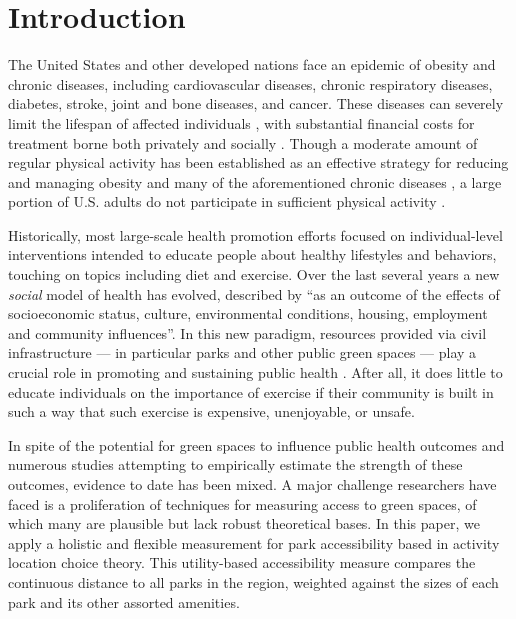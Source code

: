 \documentclass[Afour,sageh.bst]{sagej}
\begin{document}
\clearpage
\newpage
\hypertarget{introduction}{%
\section{Introduction}\label{introduction}}

The United States and other developed nations face an epidemic of
obesity and chronic diseases, including cardiovascular diseases, chronic
respiratory diseases, diabetes, stroke, joint and bone diseases, and
cancer. These diseases can severely limit the lifespan of affected
individuals \citep{WHO2014}, with substantial financial costs for
treatment borne both privately and socially \citep{Finkelstein2009}.
Though a moderate amount of regular physical activity has been
established as an effective strategy for reducing and managing obesity
and many of the aforementioned chronic diseases
\citep{CDC2009, Durstine2013}, a large portion of U.S. adults do not
participate in sufficient physical activity \citep{Wolf2008}.

Historically, most large-scale health promotion efforts focused on
individual-level interventions intended to educate people about healthy
lifestyles and behaviors, touching on topics including diet and
exercise. Over the last several years a new \emph{social} model of
health has evolved, described by \citet{Duhl1999} ``as an outcome of the
effects of socioeconomic status, culture, environmental conditions,
housing, employment and community
influences''\citeyearpar[p.7]{Duhl1999}. In this new paradigm, resources
provided via civil infrastructure --- in particular parks and other
public green spaces --- play a crucial role in promoting and sustaining
public health \citep{Bedimo-Rung2005, Wells2007, Coutts2008}. After all,
it does little to educate individuals on the importance of exercise if
their community is built in such a way that such exercise is expensive,
unenjoyable, or unsafe.

In spite of the potential for green spaces to influence public health
outcomes and numerous studies attempting to empirically estimate the
strength of these outcomes, evidence to date has been mixed. A major
challenge researchers have faced is a proliferation of techniques for
measuring access to green spaces, of which many are plausible but lack
robust theoretical bases. In this paper, we apply a holistic and
flexible measurement for park accessibility based in activity location
choice theory. This utility-based accessibility measure compares the
continuous distance to all parks in the region, weighted against the
sizes of each park and its other assorted amenities.
\end{document}
